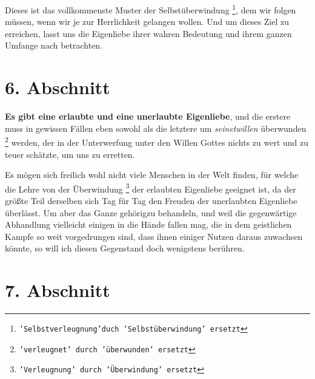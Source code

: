 \medskip

Dieses ist das vollkommenste Muster der Selbstüberwindung
\footnote{\texttt{'Selbstverleugnung'duch 'Selbstüberwindung' ersetzt}}, dem wir
folgen
müssen, wenn wir je zur Herrlichkeit gelangen wollen. Und um dieses Ziel zu
erreichen, lasst uns die Eigenliebe ihrer wahren Bedeutung und ihrem ganzen
Umfange nach betrachten.

\section{6. Abschnitt} \label{kap4_ab6}

\textbf{Es gibt eine erlaubte und eine unerlaubte Eigenliebe}, und die erstere
muss in
gewissen Fällen eben sowohl als die letztere um \textit{seinetwillen} überwunden
\footnote{\texttt{'verleugnet' durch 'überwunden' ersetzt}}
werden, der in der Unterwerfung unter den Willen Gottes nichts zu wert und zu
teuer schätzte, um uns zu erretten.

Es mögen sich freilich wohl nicht viele Menschen in der Welt finden, für welche
die Lehre von der Überwindung \footnote{\texttt{'Verleugnung' durch 'Überwindung'
ersetzt}} der erlaubten Eigenliebe geeignet ist, da der
größte Teil derselben sich Tag für Tag den Freuden der unerlaubten
Eigenliebe überlässt. Um aber das Ganze gehörigzu behandeln, und weil die
gegenwärtige Abhandlung vielleicht einigen in die Hände fallen mag, die in dem
geistlichen Kampfe so weit vorgedrungen sind, dass ihnen einiger Nutzen daraus
zuwachsen könnte, so will ich diesen Gegenstand doch wenigstens berühren.

\section{7. Abschnitt} \label{kap4_ab7}

